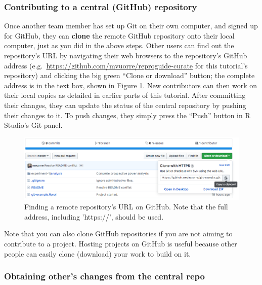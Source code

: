 \documentclass[
  american,
  ,doc,floatsintext]{apa6}
\begin{document}
\hypertarget{contributing-to-a-central-github-repository}{%
\subsubsection{Contributing to a central (GitHub) repository}\label{contributing-to-a-central-github-repository}}

Once another team member has set up Git on their own computer, and signed up for GitHub, they can \textbf{clone} the remote GitHub repository onto their local computer, just as you did in the above steps. Other users can find out the repository's URL by navigating their web browsers to the repository's GitHub address (e.g.~\url{https://github.com/mvuorre/reproguide-curate} for this tutorial's repository) and clicking the big green \enquote{Clone or download} button; the complete address is in the text box, shown in Figure \ref{fig:url-from-github}. New contributors can then work on their local copies as detailed in earlier parts of this tutorial. After committing their changes, they can update the status of the central repository by pushing their changes to it. To push changes, they simply press the \enquote{Push} button in R Studio's Git panel.

\begin{figure}

{\centering \includegraphics[width=6in]{images/github-url} 

}

\caption{Finding a remote repository's URL on GitHub. Note that the full address, including 'https://', should be used.}\label{fig:url-from-github}
\end{figure}

Note that you can also clone GitHub repositories if you are not aiming to contribute to a project. Hosting projects on GitHub is useful because other people can easily clone (download) your work to build on it.

\hypertarget{obtaining-others-changes-from-the-central-repo}{%
\subsubsection{Obtaining other's changes from the central repo}\label{obtaining-others-changes-from-the-central-repo}}
\end{document}
